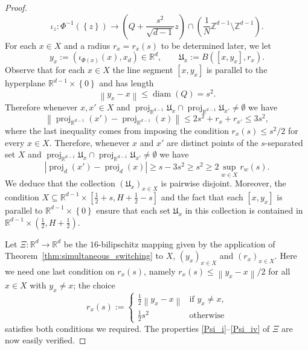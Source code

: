 \documentclass[a4paper, bibliography=totoc]{scrartcl}
\numberwithin{claimcounter}{define}
\newcommand{\R}{\mathbb{R}}
\newcommand{\Z}{\mathbb{Z}}
\DeclareMathOperator{\diam}{diam}
\DeclareMathOperator{\proj}{proj}
\newcommand{\abs}[1]{\left|#1\right|}
\newcommand{\enorm}[1]{\left\|#1\right\|}
\newcommand{\mf}[1]{\mathfrak{#1}}
\newcommand{\set}[1]{\left\{#1\right\}}
\newcommand{\br}[1]{\left(#1\right)}
\newcommand{\sqbr}[1]{\left[#1\right]}
\begin{document}
\begin{proof}
	\begin{equation*}
	\iota_{z}\colon \Phi^{-1}(\set{z})\to \br{Q+\frac{s^{2}}{\sqrt{d-1}}z}\cap \br{\frac{1}{N}\Z^{d-1}\setminus \Z^{d-1}}.
	\end{equation*}
	For each $x\in X$ and a radius $r_{x}=r_{x}(s)$ to be determined later, we let 
	\begin{equation*}
	y_{x}:=(\iota_{\Phi(x)}(x),x_{d})\in \R^{d}, \qquad \mf{U}_{x}:=B([x,y_{x}],r_{x}).
	\end{equation*}
	Observe that for each $x\in X$ the line segment $[x,y_{x}]$ is parallel to the hyperplane $\R^{d-1}\times\set{0}$ and has length 
	\begin{equation}\label{eq:dist_x-y_x}
	\enorm{y_{x}-x}\leq \diam\br{Q}=s^{2}.
	\end{equation}
	Therefore whenever $x,x'\in X$ and $\proj_{\R^{d-1}}\mf{U}_{x}\cap \proj_{\R^{d-1}}{\mf{U}_{x'}}\neq \emptyset$ we have 
	\begin{equation*}
	\enorm{\proj_{\R^{d-1}}(x')-\proj_{\R^{d-1}}(x)}\leq 2s^{2}+ r_{x}+r_{x'}\leq 3s^{2},
	\end{equation*}
	where the last inequality comes from imposing the condition $r_{x}(s)\leq s^{2}/2$ for every $x\in X$. Therefore, whenever $x$ and $x'$ are distinct points of the $s$-separated set $X$ and $\proj_{\R^{d-1}}\mf{U}_{x}\cap \proj_{\R^{d-1}}{\mf{U}_{x'}}\neq \emptyset$ we have
	\begin{equation*}
	\abs{\proj_{d}(x')-\proj_{d}(x)}\geq s-3s^{2}\geq s^{2}\geq 2\sup_{w\in X}r_{w}(s).
	\end{equation*}
	We deduce that the collection $\br{\mf{U}_{x}}_{x\in X}$ is pairwise disjoint. Moreover, the condition $X\subseteq \R^{d-1}\times \sqbr{\frac{1}{2}+s,H+\frac{1}{2}-s}$ and the fact that each $[x,y_{x}]$ is parallel to $\R^{d-1}\times \set{0}$ ensure that each set $\mf{U}_{x}$ in this collection is contained in $\R^{d-1}\times \br{\frac{1}{2},H+\frac{1}{2}}$. 
	
	
	Let $\Xi\colon \R^{d}\to\R^{d}$ be the $16$-bilipschitz mapping given by the application of Theorem~\ref{thm:simultaneous_switching} to $X$, $(y_{x})_{x\in X}$ and $(r_{x})_{x\in X}$.
	Here we need one last condition on $r_{x}(s)$, namely $r_{x}(s)\leq \enorm{y_{x}-x}/2$ for all $x\in X$ with $y_{x}\neq x$; the choice
	\begin{equation*}
	r_{x}(s):=\begin{cases}
	\frac{1}{2}\enorm{y_{x}-x} & \text{if $y_{x}\neq x$,}\\
	\frac{1}{2}s^{2} & \text{otherwise}
	\end{cases}
	\end{equation*}
	satisfies both conditions we required. The properties \eqref{Psi_i}--\eqref{Psi_iv} of $\Xi$ are now easily verified.
	

\end{proof}
\end{document}
